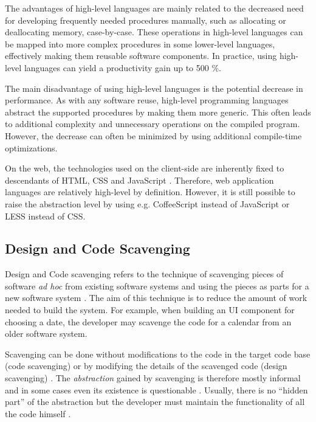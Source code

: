 The advantages of high-level languages are mainly related to the decreased need for developing frequently needed procedures manually, such as allocating or deallocating memory, case-by-case. These operations in high-level languages can be mapped into more complex procedures in some lower-level languages, effectively making them reusable software components. In practice, using high-level languages can yield a productivity gain up to 500 \%. \citep[chap.~3]{krueger_software_1992}

The main disadvantage of using high-level languages is the potential decrease in performance. As with any software reuse, high-level programming languages abstract the supported procedures by making them more generic. This often leads to additional complexity and unnecessary operations on the compiled program. However, the decrease can often be minimized by using additional compile-time optimizations. \citep{carro_high-level_2006}

On the web, the technologies used on the client-side are inherently fixed to descendants of HTML, CSS and JavaScript \citep{world_wide_web_consortium_html5_2014,world_wide_web_consortium_cascading_2011,ecma_ecmascript_2011}. Therefore, web application languages are relatively high-level by definition. However, it is still possible to raise the abstraction level by using e.g. CoffeeScript \citep{ashkenas_coffeescript_2009} instead of JavaScript or LESS \citep{sellier_less_2009} instead of CSS.

\subsection{Design and Code Scavenging}

Design and Code scavenging refers to the technique of scavenging pieces of software \emph{ad hoc} from existing software systems and using the pieces as parts for a new software system  \citep[chap.~4]{krueger_software_1992}. The aim of this technique is to reduce the amount of work needed to build the system. For example, when building an UI component for choosing a date, the developer may scavenge the code for a calendar from an older software system.

Scavenging can be done without modifications to the code in the target code base (code scavenging) or by modifying the details of the scavenged code (design scavenging) \citep[chap.~4]{krueger_software_1992}. The \emph{abstraction} gained by scavenging is therefore mostly informal and in some cases even its existence is questionable \citep[chap.~3]{sametinger_software_1997}. Usually, there is no ``hidden part'' of the abstraction but the developer must maintain the functionality of all the code himself \citep[chap.~3]{sametinger_software_1997}.

